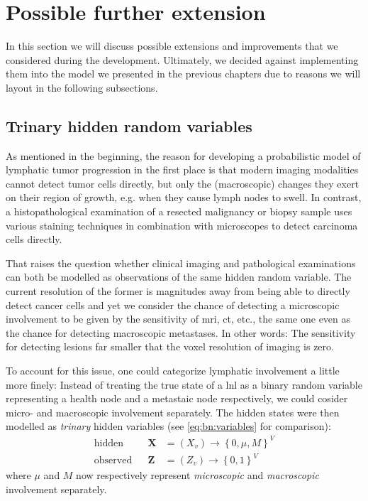\documentclass[\relativeRoot/main.tex]{subfiles}
\begin{document}
\section{Possible further extension}
\label{sec:hmm:other}

In this section we will discuss possible extensions and improvements that we considered during the development. Ultimately, we decided against implementing them into the model we presented in the previous chapters due to reasons we will layout in the following subsections.

\subsection{Trinary hidden random variables}
\label{subsec:hmm:other:trinary}

As mentioned in the beginning, the reason for developing a probabilistic model of lymphatic tumor progression in the first place is that modern imaging modalities cannot detect tumor cells directly, but only the (macroscopic) changes they exert on their region of growth, e.g. when they cause lymph nodes to swell. In contrast, a histopathological examination of a resected malignancy or biopsy sample uses various staining techniques in combination with microscopes to detect carcinoma cells directly.

That raises the question whether clinical imaging and pathological examinations can both be modelled as observations of the same hidden random variable. The current resolution of the former is magnitudes away from being able to directly detect cancer cells and yet we consider the chance of detecting a microscopic involvement to be given by the sensitivity of \gls{mri}, \gls{ct}, etc., the same one even as the chance for detecting macroscopic metastases. In other words: The sensitivity for detecting lesions far smaller that the voxel resolution of imaging is zero.

To account for this issue, one could categorize lymphatic involvement a little more finely: Instead of treating the true state of a \gls{lnl} as a binary random variable representing a health node and a metastaic node respectively, we could cosider micro- and macroscopic involvement separately. The hidden states were then modelled as \emph{trinary} hidden variables (see \cref{eq:bn:variables} for comparison):
%
\begin{equation}
    \begin{aligned}
        \text{hidden}& & \mathbf{X} &= \left( X_v \right) \rightarrow \left\{ 0, \mu, M \right\}^V \\
        \text{observed}& & \mathbf{Z} &= \left( Z_v \right) \rightarrow \left\{ 0,1 \right\}^V
    \end{aligned}
\end{equation}
%
where $\mu$ and $M$ now respectively represent \emph{microscopic} and \emph{macroscopic} involvement separately.
\end{document}
